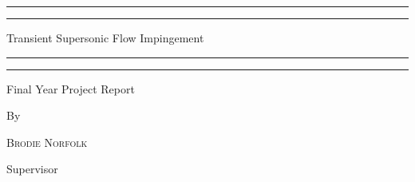 \begin{titlepage} %

	\centering %
	
	\scshape %
	
	\vspace*{3\baselineskip} %
	
	
	\rule{\textwidth}{1.6pt}\vspace*{-\baselineskip}\vspace*{2pt} %
	\rule{\textwidth}{0.4pt} %
	
	\vspace{1.5\baselineskip} %
	
	{\LARGE Transient Supersonic Flow Impingement} %
	
	\vspace{1.5\baselineskip} %
	
	\rule{\textwidth}{0.4pt}\vspace*{-\baselineskip}\vspace{3.2pt} %
	\rule{\textwidth}{1.6pt} %
	
	\vspace{2\baselineskip} %
	
	
	{\Large Final Year Project Report} %
	
	\vspace*{3\baselineskip} %
	
	
	By
	
	\vspace{0.5\baselineskip} %
	
	{\scshape\Large Brodie Norfolk} %
	
	\vspace{2\baselineskip}
	Supervisor
	

\end{titlepage}
